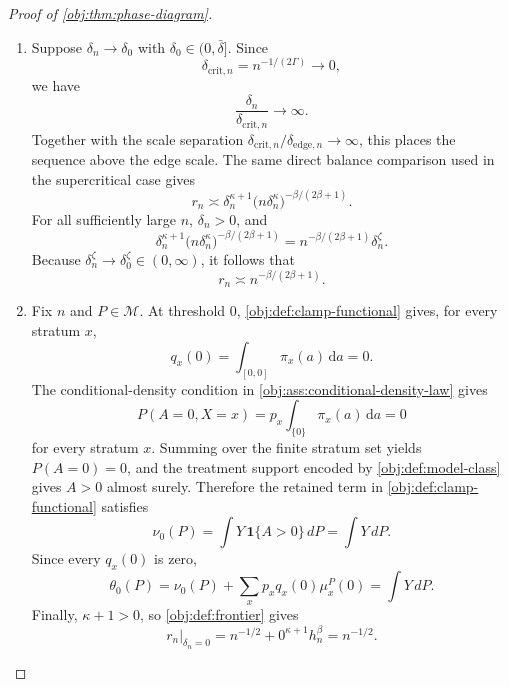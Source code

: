 \begin{proof}[Proof of \cref{obj:thm:phase-diagram}]
\begin{enumerate}
\item Suppose \(\delta_n\to\delta_0\) with \(\delta_0\in(0,\bar\delta]\).  Since
\[
\delta_{\mathrm{crit},n}=n^{-1/(2\Gamma)}\to0,
\]
we have
\[
\frac{\delta_n}{\delta_{\mathrm{crit},n}}\to\infty .
\]
Together with the scale separation
\(\delta_{\mathrm{crit},n}/\delta_{\mathrm{edge},n}\to\infty\), this places the sequence above the
edge scale.
The same direct balance comparison used in the supercritical case gives
\[
r_n\asymp
\delta_n^{\kappa+1}
\bigl(n\delta_n^\kappa\bigr)^{-\beta/(2\beta+1)} .
\]
For all sufficiently large \(n\), \(\delta_n>0\), and
\[
\delta_n^{\kappa+1}
\bigl(n\delta_n^\kappa\bigr)^{-\beta/(2\beta+1)}
=
n^{-\beta/(2\beta+1)}\delta_n^\zeta .
\]
Because \(\delta_n^\zeta\to\delta_0^\zeta\in(0,\infty)\), it follows that
\[
r_n\asymp n^{-\beta/(2\beta+1)} .
\]

\item Fix \(n\) and \(P\in\mathcal M\).  At threshold \(0\),
\cref{obj:def:clamp-functional} gives, for every stratum \(x\),
\[
q_x(0)=\int_{[0,0]}\pi_x(a)\,\mathrm da=0 .
\]
The conditional-density condition in \cref{obj:ass:conditional-density-law}
gives
\[
P(A=0,X=x)=p_x\int_{\{0\}}\pi_x(a)\,\mathrm da=0
\]
for every stratum \(x\).  Summing over the finite stratum set yields
\(P(A=0)=0\), and the treatment support encoded by \cref{obj:def:model-class}
gives \(A>0\) almost surely.  Therefore the retained term in
\cref{obj:def:clamp-functional} satisfies
\[
\nu_0(P)
=
\int Y\,\mathbf 1\{A>0\}\,dP
=
\int Y\,dP .
\]
Since every \(q_x(0)\) is zero,
\[
\theta_0(P)
=
\nu_0(P)+\sum_x p_x q_x(0)\mu_x^P(0)
=
\int Y\,dP .
\]
Finally, \(\kappa+1>0\), so \cref{obj:def:frontier} gives
\[
r_n\big|_{\delta_n=0}
=
n^{-1/2}+0^{\kappa+1}h_n^\beta
=
n^{-1/2}.
\]


\end{enumerate}
\end{proof}
